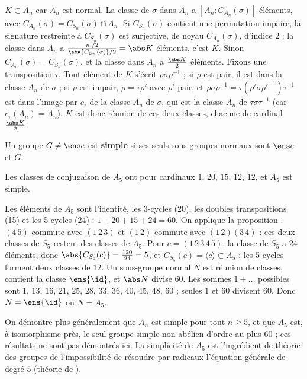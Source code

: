 \begin{preuve}
$K\subset A_n$ car $A_n$ est normal. La classe de $\sigma$ dans $A_n$ a $[A_n:C_{A_n}(\sigma)]$ éléments, avec $C_{A_n}(\sigma)=C_{S_n}(\sigma)\cap A_n$. Si $C_{S_n}(\sigma)$ contient une permutation impaire, la signature restreinte à $C_{S_n}(\sigma)$ est surjective, de noyau $C_{A_n}(\sigma)$, d'indice $2$ : la classe dans $A_n$ a $\frac{n!/2}{\abs{C_{S_n}(\sigma)}/2}=\abs K$ éléments, c'est $K$. Sinon $C_{A_n}(\sigma)=C_{S_n}(\sigma)$, et la classe dans $A_n$ a $\frac{\abs K}2$ éléments. Fixons une transposition $\tau$. Tout élément de $K$ s'écrit $\rho\sigma\rho^{-1}$ ; si $\rho$ est pair, il est dans la classe $A_n$ de $\sigma$ ; si $\rho$ est impair, $\rho=\tau\rho'$ avec $\rho'$ pair, et $\rho\sigma\rho^{-1}=\tau(\rho'\sigma\rho'^{-1})\tau^{-1}$ est dans l'image par $c_\tau$ de la classe $A_n$ de $\sigma$, qui est la classe $A_n$ de $\tau\sigma\tau^{-1}$ (car $c_\tau(A_n)=A_n$). $K$ est donc réunion de ces deux classes, chacune de cardinal $\frac{\abs K}2$.
\end{preuve}
\begin{definition}
Un groupe $G\neq\ens e$ est \textbf{simple} si ses seuls sous-groupes normaux sont $\ens e$ et $G$.
\end{definition}
\begin{theoreme}[Simplicité de $A_5$]\label{thm-a5-simple}
Les classes de conjugaison de $A_5$ ont pour cardinaux $1$, $20$, $15$, $12$, $12$, et $A_5$ est simple.
\end{theoreme}
\begin{preuve}
Les éléments de $A_5$ sont l'identité, les 3-cycles (20), les doubles transpositions (15) et les 5-cycles (24) : $1+20+15+24=60$. On applique la proposition . $(4\,5)$ commute avec $(1\,2\,3)$ et $(1\,2)$ commute avec $(1\,2)(3\,4)$ : ces deux classes de $S_5$ restent des classes de $A_5$. Pour $c=(1\,2\,3\,4\,5)$, la classe de $S_5$ a $24$ éléments, donc $\abs{C_{S_5}(c)}=\frac{120}{24}=5$, et $C_{S_5}(c)=\langle c\rangle\subset A_5$ : les 5-cycles forment deux classes de $12$. Un sous-groupe normal $N$ est réunion de classes, contient la classe $\ens{\id}$, et $\abs N$ divise $60$. Les sommes $1+\dots$ possibles sont $1$, $13$, $16$, $21$, $25$, $28$, $33$, $36$, $40$, $45$, $48$, $60$ ; seules $1$ et $60$ divisent $60$. Donc $N=\ens{\id}$ ou $N=A_5$.
\end{preuve}
\begin{remarque}
On démontre plus généralement que $A_n$ est simple pour tout $n\ge5$, et que $A_5$ est, à isomorphisme près, le seul groupe simple non abélien d'ordre au plus $60$ ; ces résultats ne sont pas démontrés ici. La simplicité de $A_5$ est l'ingrédient de théorie des groupes de l'impossibilité de résoudre par radicaux l'équation générale de degré $5$ (théorie de ).
\end{remarque}

